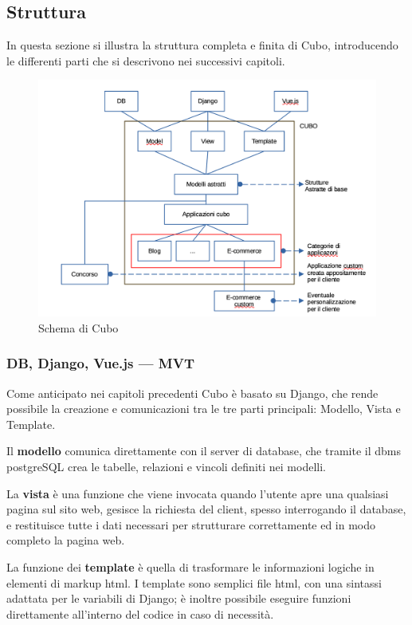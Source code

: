 \documentclass[12pt,a4paper]{article}
\begin{document}
\subsection{Struttura}
In questa sezione si illustra la struttura completa e finita di Cubo, introducendo le differenti parti che si descrivono nei successivi capitoli.
\begin{figure}[H]
    \includegraphics[width=1\linewidth]{cubo_scheme.png}
    \caption{Schema di Cubo}
\end{figure}

\subsubsection{DB, Django, Vue.js --- MVT}
Come anticipato nei capitoli precedenti Cubo è basato su Django, che rende possibile la creazione e comunicazioni tra le tre parti principali: Modello, Vista e Template.

Il \textbf{modello} comunica direttamente con il server di database, che tramite il dbms postgreSQL crea le tabelle, relazioni e vincoli definiti nei modelli.

La \textbf{vista} è una funzione che viene invocata quando l’utente apre una qualsiasi pagina sul sito web, gesisce la richiesta del client, spesso interrogando il database, e  restituisce tutte i dati necessari per strutturare correttamente ed in modo completo la pagina web.

La funzione dei \textbf{template} è quella di trasformare le informazioni logiche in elementi di markup html.
I template sono semplici file html, con una sintassi adattata per le variabili di Django; è inoltre possibile eseguire funzioni direttamente all’interno del codice in caso di necessità.
\end{document}
